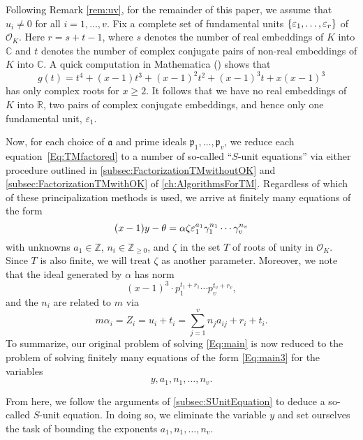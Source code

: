 Following Remark \ref{rem:uv}, for the remainder of this paper, we assume that $u_i \neq 0$ for all $i = 1, \dots, v$. Fix a complete set of fundamental units $\{\varepsilon_1, \dots, \varepsilon_r\}$ of $\mathcal{O}_K$. Here $r = s + t -1$, where $s$ denotes the number of real embeddings of $K$ into $\mathbb{C}$ and $t$ denotes the number of complex conjugate pairs of non-real embeddings of $K$ into $\mathbb{C}$. A quick computation in Mathematica () shows that  
\[g(t) = t^4 + (x-1)t^3 + (x-1)^2t^2 + (x-1)^3t + x(x-1)^3\]
has only complex roots for $x \geq 2$. It follows that we have no real embeddings of $K$ into $\mathbb{R}$, two pairs of complex conjugate embeddings, and hence only one fundamental unit, $\varepsilon_1$. 

Now, for each choice of $\mathfrak{a}$ and prime ideals $\mathfrak{p}_1, \dots, \mathfrak{p}_v$, we reduce each equation~\eqref{Eq:TMfactored} to a number of so-called ``$S$-unit equations'' via either procedure outlined in \autoref{subsec:FactorizationTMwithoutOK} and \autoref{subsec:FactorizationTMwithOK} of \autoref{ch:AlgorithmsForTM}. Regardless of which of these principalization methods is used, we arrive at finitely many equations of the form
\begin{equation} \label{Eq:main2}
(x-1)y - \theta = \alpha \zeta \varepsilon_1^{a_1}\gamma_1^{n_1}\cdots \gamma_v^{n_v}
\end{equation}
with unknowns $a_1 \in \mathbb{Z}$, $n_i \in \mathbb{Z}_{\geq 0}$, and $\zeta$ in the set $T$ of roots of unity in $\mathcal{O}_K$. Since $T$ is also finite, we will treat $\zeta$ as another parameter. Moreover, we note that the ideal generated by $\alpha$ has norm
\begin{equation} \label{Eq:main3}
(x-1)^3\cdot p_1^{t_1 + r_1} \cdots p_v^{t_v + r_v},
\end{equation}
and the $n_i$ are related to $m$ via
\[m \alpha_i = Z_i = u_i + t_i = \sum_{j = 1}^{v}n_ja_{ij} + r_i + t_i.\]
To summarize, our original problem of solving \eqref{Eq:main} is now reduced to the problem of solving finitely many equations of the form \eqref{Eq:main3} for the variables 
\[y, a_1, n_1, \dots, n_v.\] 

From here, we follow the arguments of \autoref{subsec:SUnitEquation} to deduce a so-called $S$-unit equation. In doing so, we eliminate the variable $y$ and set ourselves the task of bounding the exponents $a_1, n_1, \dots, n_v$. 

